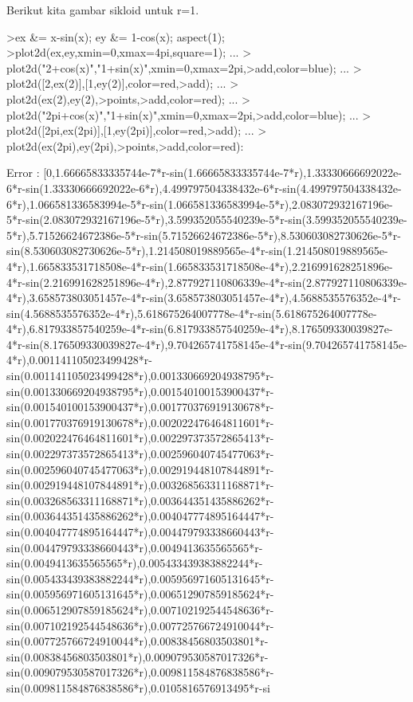 \documentclass[12pt,arial,letterpaper]{book}
\begin{document}
\begin{eulercomment}
\begin{eulercomment}
\begin{eulercomment}
\begin{eulercomment}
\begin{eulercomment}
\begin{eulercomment}
\begin{eulercomment}
\begin{eulercomment}
\begin{eulercomment}
\begin{eulercomment}
\begin{eulercomment}
\begin{eulercomment}
\begin{eulercomment}
\begin{eulercomment}
\begin{eulercomment}
\begin{eulercomment}
\begin{eulercomment}
\begin{eulercomment}
\begin{eulercomment}
\begin{eulercomment}
\begin{eulercomment}
\begin{eulercomment}
\begin{euleroutput}
\end{euleroutput}
\begin{eulercomment}
Berikut kita gambar sikloid untuk r=1.
\end{eulercomment}
\begin{eulerprompt}
>ex &= x-sin(x); ey &= 1-cos(x); aspect(1);
>plot2d(ex,ey,xmin=0,xmax=4pi,square=1); ...
>  plot2d("2+cos(x)","1+sin(x)",xmin=0,xmax=2pi,>add,color=blue); ...
>  plot2d([2,ex(2)],[1,ey(2)],color=red,>add); ...
>  plot2d(ex(2),ey(2),>points,>add,color=red); ...
>  plot2d("2pi+cos(x)","1+sin(x)",xmin=0,xmax=2pi,>add,color=blue); ...
>  plot2d([2pi,ex(2pi)],[1,ey(2pi)],color=red,>add);  ...
>  plot2d(ex(2pi),ey(2pi),>points,>add,color=red):
\end{eulerprompt}
\begin{euleroutput}
  Error : [0,1.66665833335744e-7*r-sin(1.66665833335744e-7*r),1.33330666692022e-6*r-sin(1.33330666692022e-6*r),4.499797504338432e-6*r-sin(4.499797504338432e-6*r),1.066581336583994e-5*r-sin(1.066581336583994e-5*r),2.083072932167196e-5*r-sin(2.083072932167196e-5*r),3.599352055540239e-5*r-sin(3.599352055540239e-5*r),5.71526624672386e-5*r-sin(5.71526624672386e-5*r),8.530603082730626e-5*r-sin(8.530603082730626e-5*r),1.214508019889565e-4*r-sin(1.214508019889565e-4*r),1.665833531718508e-4*r-sin(1.665833531718508e-4*r),2.216991628251896e-4*r-sin(2.216991628251896e-4*r),2.877927110806339e-4*r-sin(2.877927110806339e-4*r),3.658573803051457e-4*r-sin(3.658573803051457e-4*r),4.5688535576352e-4*r-sin(4.5688535576352e-4*r),5.618675264007778e-4*r-sin(5.618675264007778e-4*r),6.817933857540259e-4*r-sin(6.817933857540259e-4*r),8.176509330039827e-4*r-sin(8.176509330039827e-4*r),9.704265741758145e-4*r-sin(9.704265741758145e-4*r),0.001141105023499428*r-sin(0.001141105023499428*r),0.001330669204938795*r-sin(0.001330669204938795*r),0.001540100153900437*r-sin(0.001540100153900437*r),0.001770376919130678*r-sin(0.001770376919130678*r),0.002022476464811601*r-sin(0.002022476464811601*r),0.002297373572865413*r-sin(0.002297373572865413*r),0.002596040745477063*r-sin(0.002596040745477063*r),0.002919448107844891*r-sin(0.002919448107844891*r),0.003268563311168871*r-sin(0.003268563311168871*r),0.003644351435886262*r-sin(0.003644351435886262*r),0.004047774895164447*r-sin(0.004047774895164447*r),0.004479793338660443*r-sin(0.004479793338660443*r),0.0049413635565565*r-sin(0.0049413635565565*r),0.005433439383882244*r-sin(0.005433439383882244*r),0.005956971605131645*r-sin(0.005956971605131645*r),0.006512907859185624*r-sin(0.006512907859185624*r),0.007102192544548636*r-sin(0.007102192544548636*r),0.007725766724910044*r-sin(0.007725766724910044*r),0.00838456803503801*r-sin(0.00838456803503801*r),0.009079530587017326*r-sin(0.009079530587017326*r),0.009811584876838586*r-sin(0.009811584876838586*r),0.0105816576913495*r-si
\end{euleroutput}
\end{eulercomment}
\end{eulercomment}
\end{eulercomment}
\end{eulercomment}
\end{eulercomment}
\end{eulercomment}
\end{eulercomment}
\end{eulercomment}
\end{eulercomment}
\end{eulercomment}
\end{eulercomment}
\end{eulercomment}
\end{eulercomment}
\end{eulercomment}
\end{eulercomment}
\end{eulercomment}
\end{eulercomment}
\end{eulercomment}
\end{eulercomment}
\end{eulercomment}
\end{eulercomment}
\end{eulercomment}
\end{document}
